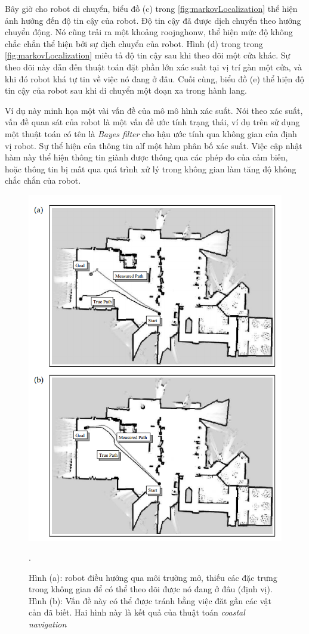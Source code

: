 Bây giờ cho robot di chuyển, biểu đồ (c) trong \figurename{\ref{fig:markovLocalization}} thể hiện ảnh hưởng đến độ tin cậy của robot. Độ tin cậy đã được dịch chuyển theo hướng chuyển động. Nó cũng trải ra một khoảng roojnghonw, thể hiện mức độ không chắc chắn thể hiện bởi sự dịch chuyển của robot. Hình (d) trong trong \figurename{\ref{fig:markovLocalization}} miêu tả độ tin cậy sau khi theo dõi một cửa khác. Sự theo dõi này dẫn đến thuật toán đặt phần lớn xác suất tại vị trí gàn một cửa, và khi đó robot khá tự tin về việc nó đang ở đâu. Cuối cùng, biểu đồ (e) thể hiện độ tin cậy của robot sau khi di chuyển một đoạn xa trong hành lang.

Ví dụ này minh họa một vài vấn đề của mô mô hình xác suất. Nói theo xác suất, vấn đề quan sát của robot là một vấn đề ước tính trạng thái, ví dụ trên sử dụng một thuật toán có tên là \textit{Bayes filter} cho hậu ước tính qua không gian của định vị robot. Sự thể hiện của thông tin alf một hàm phân bố xác suất. Việc cập nhật hàm này thể hiện thông tin giành được thông qua các phép đo của cảm biến, hoặc thông tin bị mất qua quá trình xử lý trong không gian làm tăng độ không chắc chắn của robot.

\begin{figure}[htbp]
  \centering
  \includegraphics[width=0.8\linewidth]{figures/coastal-Navigation.png}
  \caption{Hình (a): robot điều hướng qua môi trường mở, thiếu các đặc trưng trong không gian để có thể theo dõi được nó đang ở đâu (định vị). Hình (b): Vấn đề này có thể được tránh bằng việc đăt gần các vật cản đã biết. Hai hình này là kết quả của thuật toán \textit{coastal navigation} \cite{thrun2005probabilistic}}.
  \label{fig:coastalNavigation}
\end{figure}

